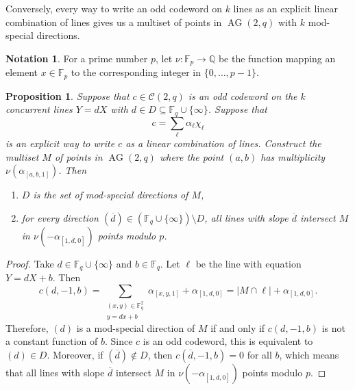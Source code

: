 \documentclass[12pt, a4paper]{article}
\newtheorem{prop}[thm]{Proposition}
\theoremstyle{definition}
\newtheorem{nota}[thm]{Notation}
\newcommand{\FF}{\mathbb F}
\newcommand{\QQ}{\mathbb Q}
\newcommand{\mc}{\mathcal C}
\newcommand{\fqi}{\FF_q \cup \{\infty\}}
\DeclareMathOperator{\AG}{AG}
\newcommand{\ag}{\AG}
\begin{document}
Conversely, every way to write an odd codeword on $k$ lines as an explicit linear combination of lines gives us a multiset of points in $\ag(2,q)$ with $k$ mod-special directions.

\begin{nota}
 \label{Not:Nu}
 For a prime number $p$, let $\nu: \FF_p \to \QQ$ be the function mapping an element $x \in \FF_p$ to the corresponding integer in $\{0, \dots, p-1\}$.
\end{nota}

\begin{prop}
 \label{Prop:CodeToSet}
 Suppose that $c \in \mc(2,q)$ is an odd codeword on the $k$ concurrent lines $Y = d X$ with $d \in D \subseteq \fqi$.
 Suppose that
 \[
  c = \sum_{\ell} \alpha_{\ell} \chi_\ell
 \]
 is an explicit way to write $c$ as a linear combination of lines.
 Construct the multiset $M$ of points in $\ag(2,q)$ where the point $(a,b)$ has multiplicity $\nu(\alpha_{[a,b,1]})$.
 Then
 \begin{enumerate}
  \item $D$ is the set of mod-special directions of $M$,
  \item for every direction $(\overline d) \in (\fqi) \setminus D$, all lines with slope $\overline d$ intersect $M$ in $\nu(-\alpha_{[1,\overline d, 0]})$ points modulo $p$.
 \end{enumerate}
\end{prop}

\begin{proof}
 Take $d \in \fqi$ and $b \in \FF_q$.
 Let $\ell$ be the line with equation $Y = d X + b$.
 Then
 \[
  c(d,-1,b) = \sum_{\substack{(x,y) \in \FF_q^2 \\ y = d x + b}} \alpha_{[x,y,1]} + \alpha_{[1,d,0]}
  = |M \cap \ell| + \alpha_{[1,d,0]}.
 \]
 Therefore, $(d)$ is a mod-special direction of $M$ if and only if $c(d,-1,b)$ is not a constant function of $b$.
 Since $c$ is an odd codeword, this is equivalent to $(d) \in D$.
 Moreover, if $(\overline d) \notin D$, then $c(\overline d,-1,b) = 0$ for all $b$, which means that all lines with slope $\overline d$ intersect $M$ in $\nu(-\alpha_{[1,\overline d, 0]})$ points modulo $p$.
\end{proof}

\end{document}
